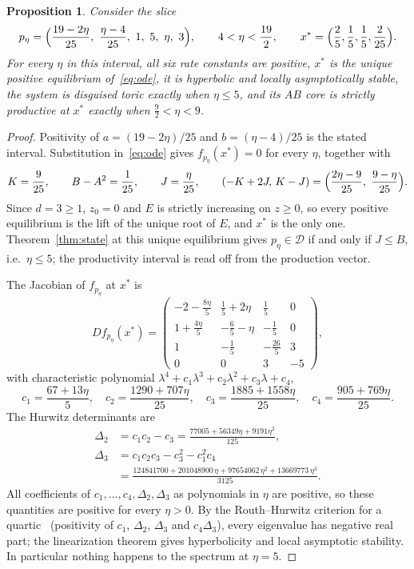 \documentclass[11pt,a4paper]{article}
\theoremstyle{plain}
\newtheorem{proposition}[theorem]{Proposition}
\theoremstyle{definition}
\theoremstyle{remark}
\newcommand{\DT}{\mathcal{D}}
\newcommand{\xs}{x^{*}}
\begin{document}
\begin{proposition}\label{prop:slice}
Consider the slice
\begin{equation}\label{eq:slice}
p_\eta=\Bigl(\frac{19-2\eta}{25},\ \frac{\eta-4}{25},\ 1,\ 5,\ \eta,\ 3\Bigr),\qquad 4<\eta<\frac{19}2,\qquad
\xs=\Bigl(\frac25,\frac15,\frac15,\frac2{25}\Bigr).
\end{equation}
For every $\eta$ in this interval, all six rate constants are positive, $\xs$ is the unique positive equilibrium of~\eqref{eq:ode}, it is hyperbolic and locally asymptotically stable, the system is disguised toric exactly when $\eta\le5$, and its $AB$ core is strictly productive at $\xs$ exactly when $\tfrac92<\eta<9$.
\end{proposition}
\begin{proof}
Positivity of $a=(19-2\eta)/25$ and $b=(\eta-4)/25$ is the stated interval. Substitution in~\eqref{eq:ode} gives $f_{p_\eta}(\xs)=0$ for every $\eta$, together with
\[
K=\frac9{25},\qquad B-A^2=\frac1{25},\qquad J=\frac\eta{25},\qquad
(-K+2J,\,K-J)=\Bigl(\frac{2\eta-9}{25},\ \frac{9-\eta}{25}\Bigr).
\]
Since $d=3\ge1$, $z_0=0$ and $E$ is strictly increasing on $z\ge0$, so every positive equilibrium is the lift of the unique root of $E$, and $\xs$ is the only one. Theorem~\ref{thm:state} at this unique equilibrium gives $p_\eta\in\DT$ if and only if $J\le B$, i.e.\ $\eta\le5$; the productivity interval is read off from the production vector.

The Jacobian of $f_{p_\eta}$ at $\xs$ is
\begin{equation}\label{eq:jac}
Df_{p_\eta}(\xs)=\begin{pmatrix}
-2-\tfrac{8\eta}5&\tfrac15+2\eta&\tfrac15&0\\[2pt]
1+\tfrac{4\eta}5&-\tfrac65-\eta&-\tfrac15&0\\[2pt]
1&-\tfrac15&-\tfrac{26}5&3\\[2pt]
0&0&3&-5
\end{pmatrix},
\end{equation}
with characteristic polynomial $\lambda^4+c_1\lambda^3+c_2\lambda^2+c_3\lambda+c_4$,
\begin{equation}\label{eq:char}
c_1=\frac{67+13\eta}5,\quad c_2=\frac{1290+707\eta}{25},\quad c_3=\frac{1885+1558\eta}{25},\quad c_4=\frac{905+769\eta}{25}.
\end{equation}
The Hurwitz determinants are
\begin{align*}
\Delta_2&=c_1c_2-c_3=\frac{77005+56349\eta+9191\eta^2}{125},\\
\Delta_3&=c_1c_2c_3-c_3^2-c_1^2c_4\\
&=\frac{124841700+201048900\,\eta+97654062\,\eta^2+13669773\,\eta^3}{3125}.
\end{align*}
All coefficients of $c_1,\dots,c_4,\Delta_2,\Delta_3$ as polynomials in $\eta$ are positive, so these quantities are positive for every $\eta>0$. By the Routh--Hurwitz criterion for a quartic~\cite{Gantmacher1959} (positivity of $c_1$, $\Delta_2$, $\Delta_3$ and $c_4\Delta_3$), every eigenvalue has negative real part; the linearization theorem gives hyperbolicity and local asymptotic stability. In particular nothing happens to the spectrum at $\eta=5$.
\end{proof}
\end{document}
